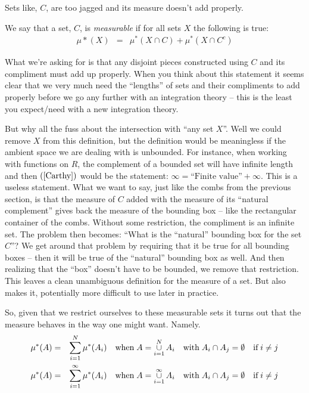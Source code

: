 \documentclass{article}
\begin{document}
Sets like, $C$, are too jagged and its measure doesn't add properly.

We say that a set, $C$, is {\em measurable\/}
if for all sets $X$ the following is true:
\begin{eqnarray}
	\mu*(X) & = & \mu^*(X \cap C) + \mu^*(X \cap C^c) \label{Carthy}
\end{eqnarray}

What we're asking for is that any disjoint pieces constructed using $C$ and 
its compliment must add up properly. When you think about this statement it
seems clear that we very much need the ``lengths'' of sets and their compliments
to add properly before we go any further with an integration theory -- this 
is the least you expect/need with a new integration theory.

But why all the fuss about the intersection with ``any set $X$''.
Well we could remove $X$ from this definition, but the definition would be 
meaningless if the ambient space we are dealing with is unbounded. For instance,
when working with functions on $R$, the complement of a bounded set will have 
infinite length and then $(\ref{Carthy})$ would be the statement: 
$\infty = \text{``Finite value''} + \infty$.
This is a useless statement. What we want to say, just like the combs from the
previous section, is that the measure of $C$ added with the measure of its 
``natural complement'' gives back the measure of the bounding box -- like the rectangular
container of the combs. Without some restriction, the compliment is an infinite set.
The problem then becomes: ``What is the ``natural'' bounding box for the set $C$''?
We get around that problem by requiring that it be true for all bounding boxes -- 
then it will be true of the ``natural'' bounding box as well.
And then realizing that the ``box'' doesn't have to be bounded, we remove that restriction.
This leaves a clean unambiguous definition for the measure of a set. But also makes it,
potentially more difficult to use later in practice.
 
So, given that we restrict ourselves to these measurable sets it turns out that
the measure behaves in the way one might want. Namely.
\begin{eqnarray*}
	\mu^*(A) & = & \sum_{i=1}^N\limits \mu^*(A_i) \quad \text{when} \; A = \mathop{\cup}_{i=1}^N\limits A_i \quad \text{with} \;  A_i \cap A_j = \emptyset \quad \text{if} \; i \neq j \\
	\mu^*(A) & = & \sum_{i=1}^\infty\limits \mu^*(A_i) \quad \text{when} \; A = \mathop{\cup}_{i=1}^\infty\limits A_i \quad \text{with} \; A_i \cap A_j = \emptyset \quad \text{if} \; i \neq j
\end{eqnarray*}
\end{document}
